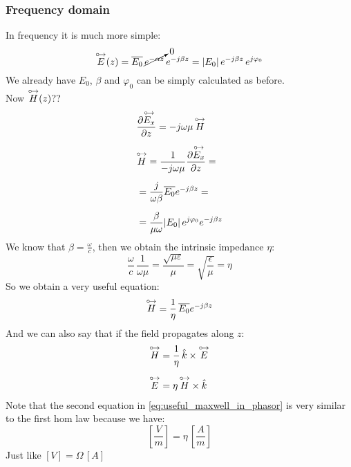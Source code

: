 \subsubsection*{Frequency domain}
In frequency it is much more simple:
\begin{equation*}
    \overset{\mathbin {{\circ \mkern-2.5mu\rightarrow}}}{E}(z)=\overline{E_0}\,\cancelto{0}{e^{-\alpha z}}\,e^{-j\beta z}=|E_0|\,e^{-j\beta z}\,e^{j\varphi_0}
\end{equation*}
We already have $E_0$, $\beta$ and $\varphi_0$ can be simply calculated as before.\\
Now $\overset{\mathbin {{\circ \mkern-2.5mu\rightarrow}}}{H}(z)$??
\begin{align}
    \begin{split}
        &\frac{\partial \overset{\mathbin {{\circ \mkern-2.5mu\rightarrow}}}{E_x}}{\partial z}=-j\omega\mu\,\overset{\mathbin {{\circ \mkern-2.5mu\rightarrow}}}{H}\\[5pt]
        &\overset{\mathbin {{\circ \mkern-2.5mu\rightarrow}}}{H}=\frac{1}{-j\omega\mu}\frac{\partial \overset{\mathbin {{\circ \mkern-2.5mu\rightarrow}}}{E_x}}{\partial z}=\\[5pt]
        &=\frac{j}{\omega \beta}\overline{E_0}e^{-j\beta z}=\\[5pt]
        &=\frac{\beta}{\mu \omega}|E_0|\, e^{j\varphi_0}e^{-j\beta z}
    \end{split}
\end{align}
We know that $\beta = \frac{\omega}{c}$, then we obtain the intrinsic impedance $\eta$:
\begin{equation}\label{eq:intrinsic_impedance}
    \frac{\omega}{c}\,\frac{1}{\omega \mu}=\frac{\sqrt{\mu \varepsilon}}{\mu}=\sqrt{\frac{\epsilon}{\mu}}=\eta 
\end{equation}
So we obtain a very useful equation:
\begin{equation}
    \overset{\mathbin {{\circ \mkern-2.5mu\rightarrow}}}{H}=\frac{1}{\eta}\,\overline{E_0}e^{-j\beta z}
\end{equation}
And we can also say that if the field propagates along $z$:
\begin{align}\label{eq:useful_maxwell_in_phasor}
    \begin{split}
        \overset{\mathbin {{\circ \mkern-2.5mu\rightarrow}}}{H}&=\frac{1}{\eta}\,\hat{\mathnormal{k}} \times \overset{\mathbin {{\circ \mkern-2.5mu\rightarrow}}}{E}\\[5pt]
        \overset{\mathbin {{\circ \mkern-2.5mu\rightarrow}}}{E}&=\eta\,\overset{\mathbin {{\circ \mkern-2.5mu\rightarrow}}}{H}\times \hat{\mathnormal{k}}
    \end{split}
\end{align}
Note that the second equation in \cref{eq:useful_maxwell_in_phasor} is very similar to the first hom law because we have:
\begin{equation*}
    \left[\frac{V}{m}\right]=\eta\,\left[\frac{A}{m}\right]
\end{equation*}
Just like $\left[V\right]=\Omega \,\left[A\right]$
